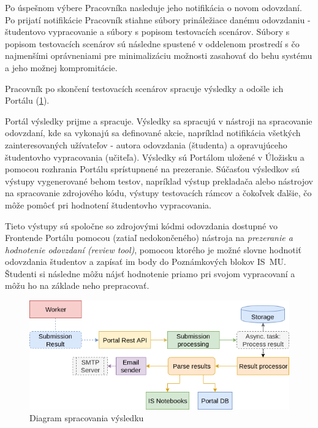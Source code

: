 \documentclass[
  digital, %
  oneside, %
  table,   %
  lof,     %
  lot,   %
]{fithesis3}
\begin{document}
Po úspešnom výbere Pracovníka nasleduje jeho notifikácia o novom odovzdaní. Po prijatí notifikácie Pracovník stiahne súbory prináležiace danému odovzdaniu - študentovo vypracovanie a súbory s popisom testovacích scenárov. Súbory s popisom testovacích scenárov sú následne spustené v oddelenom prostredí s čo najmenšími oprávneniami pre minimalizáciu možnosti zasahovať do behu systému a jeho možnej kompromitácie.

Pracovník po skončení testovacích scenárov spracuje výsledky a odošle ich Portálu (\ref{fig:proc-result}).

Portál výsledky prijme a spracuje. Výsledky sa spracujú v nástroji na spracovanie odovzdaní, kde sa vykonajú sa definované akcie, napríklad notifikácia všetkých zainteresovaných užívateľov - autora odovzdania (študenta) a opravujúceho študentovho vypracovania (učiteľa). Výsledky sú Portálom uložené v Úložisku a pomocou rozhrania Portálu sprístupnené na prezeranie. Súčasťou výsledkov sú výstupy vygenerované behom testov, napríklad výstup prekladača alebo nástrojov na spracovanie zdrojového kódu, výstupy testovacích rámcov a čokoľvek ďalšie, čo môže pomôcť pri hodnotení študentovho vypracovania.

Tieto výstupy sú spoločne so zdrojovými kódmi odovzdania dostupné vo Frontende Portálu pomocou (zatiaľ nedokončeného) nástroja na \emph{prezeranie a hodnotenie odovzdaní (review tool)}, pomocou ktorého je možné slovne hodnotiť odovzdania študentov a zapísať im body do Poznámkových blokov IS~MU. Študenti si následne môžu nájsť hodnotenie priamo pri svojom vypracovaní a môžu ho na základe neho prepracovať. 

\begin{figure}[!ht]
  \begin{center}
    \includegraphics[width=\textwidth]{imgs/process-result.png}
  \end{center}
    \caption{Diagram spracovania výsledku}
    \label{fig:proc-result}
\end{figure}
\end{document}
